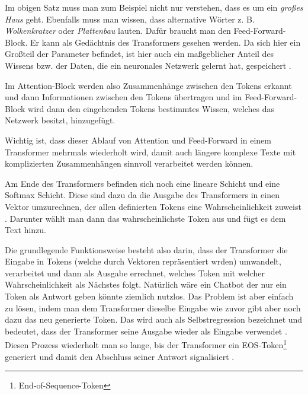 	Im obigen Satz muss man zum Beispiel nicht nur verstehen, dass es um ein \emph{großes Haus} geht. Ebenfalls muss man wissen, dass alternative
	Wörter z. B. \emph{Wolkenkratzer} oder \emph{Plattenbau} lauten. Dafür braucht man den Feed-Forward-Block. Er kann als Gedächtnis des Transformers gesehen
	werden. Da sich hier ein Großteil der Parameter befindet, ist hier auch ein maßgeblicher Anteil des Wissens bzw. der Daten, die ein neuronales
	Netzwerk gelernt hat, gespeichert \cite{geva2024}.
	\vspace{5mm}
	
	Im Attention-Block werden also Zusammenhänge zwischen den Tokens erkannt und dann Informationen zwischen den Tokens übertragen
	und im Feed-Forward-Block wird dann den eingehenden Tokens bestimmtes Wissen, welches das Netzwerk besitzt, hinzugefügt.
	
	Wichtig ist, dass dieser Ablauf von Attention und Feed-Forward in einem Transformer mehrmals wiederholt wird, damit auch längere komplexe Texte mit
	komplizierten Zusammenhängen sinnvoll verarbeitet werden können.
	
	Am Ende des Transformers befinden sich noch eine lineare Schicht und eine Softmax Schicht. Diese sind dazu da die Ausgabe des Transformers
	in einen Vektor umzurechnen, der allen definierten Tokens eine Wahrscheinlichkeit zuweist \cite[S. 70]{nielsen2015}. Darunter wählt man 
	dann das wahrscheinlichste Token aus und fügt es dem Text hinzu. 	
	
	Die grundlegende Funktionsweise besteht also darin, dass der Transformer die Eingabe in Tokens (welche durch Vektoren repräsentiert wrden) 
	umwandelt, verarbeitet und dann als Ausgabe errechnet, welches Token mit welcher Wahrscheinlichkeit als Nächstes folgt. Natürlich wäre ein Chatbot der nur
	ein Token als Antwort geben könnte ziemlich nutzlos. Das Problem ist aber einfach zu lösen, indem man dem Transformer
	dieselbe Eingabe wie zuvor gibt aber noch dazu das neu generierte Token. Das wird auch als Selbstregression bezeichnet und 
	bedeutet, dass der Transformer seine Ausgabe wieder als Eingabe verwendet \cite[S. 2]{vaswani2017}. Diesen Prozess wiederholt 
	man so lange, bis der Transformer ein EOS-Token\footnote{End-of-Sequence-Token} generiert und damit den Abschluss seiner 
	Antwort signalisiert \cite[S. 2]{vaswani2017}.
	
	\clearpage
